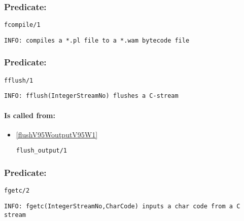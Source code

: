 \subsubsection{Predicate:} \label{fcompileV95W1}

\begin{verbatim}
fcompile/1
\end{verbatim}

{\small \begin{verbatim}
INFO: compiles a *.pl file to a *.wam bytecode file

\end{verbatim}}

\subsubsection{Predicate:} \label{fflushV95W1}

\begin{verbatim}
fflush/1
\end{verbatim}

{\small \begin{verbatim}
INFO: fflush(IntegerStreamNo) flushes a C-stream

\end{verbatim}}
\paragraph{Is called from:} 
\begin{itemize}
\item \ref{flushV95WoutputV95W1} 
\begin{verbatim}
flush_output/1
\end{verbatim}

\end{itemize}

\subsubsection{Predicate:} \label{fgetcV95W2}

\begin{verbatim}
fgetc/2
\end{verbatim}

{\small \begin{verbatim}
INFO: fgetc(IntegerStreamNo,CharCode) inputs a char code from a C stream

\end{verbatim}}

